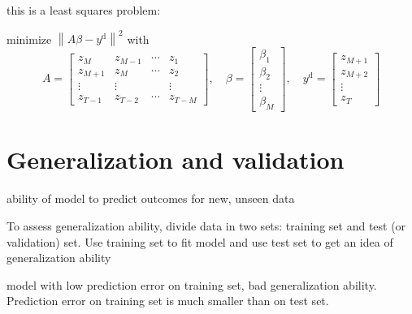 \begin{problem}
    this is a least squares problem: 
    
    minimize $ \left\|A \beta-y^{\mathrm{d}}\right\|^{2} $ with
$$
A=\left[\begin{array}{cccc}
z_{M} & z_{M-1} & \cdots & z_{1} \\
z_{M+1} & z_{M} & \cdots & z_{2} \\
\vdots & \vdots & & \vdots \\
z_{T-1} & z_{T-2} & \cdots & z_{T-M}
\end{array}\right], \quad \beta=\left[\begin{array}{c}
\beta_{1} \\
\beta_{2} \\
\vdots \\
\beta_{M}
\end{array}\right], \quad y^{\mathrm{d}}=\left[\begin{array}{c}
z_{M+1} \\
z_{M+2} \\
\vdots \\
z_{T}
\end{array}\right]
$$

\end{problem}



\section{Generalization and validation}

\begin{definition}
    ability of model to predict outcomes for new, unseen data
\end{definition}

\begin{definition}
    To assess generalization ability, divide data in two sets: training set and test (or validation) set. Use training set to fit model and use test set to get an idea of generalization ability
\end{definition}

\begin{definition}
    model with low prediction error on training set, bad generalization ability. Prediction error on training set is much smaller than on test set.
\end{definition}


